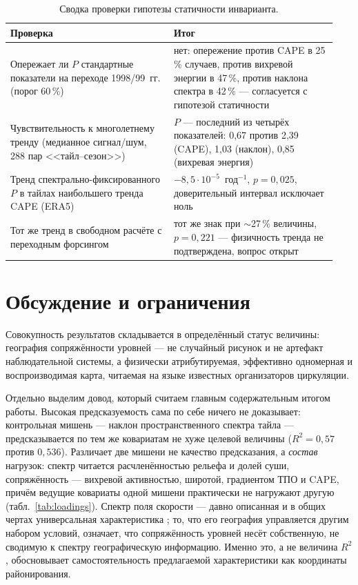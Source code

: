 \documentclass[11pt,a4paper]{article}
\begin{document}
\begin{table}[t]
\centering
\caption{Сводка проверки гипотезы статичности инварианта.}
\label{tab:static}
\small
\begin{tabular}{@{}p{0.47\linewidth}p{0.47\linewidth}@{}}
\toprule
Проверка & Итог\\
\midrule
Опережает ли $P$ стандартные показатели на переходе 1998/99~гг. (порог 60\,\%) & нет: опережение против CAPE в 25\,\% случаев, против вихревой энергии в 47\,\%, против наклона спектра в 42\,\% --- согласуется с гипотезой статичности\\
Чувствительность к многолетнему тренду (медианное сигнал/шум, 288 пар <<тайл--сезон>>) & $P$ --- последний из четырёх показателей: 0,67 против 2,39 (CAPE), 1,03 (наклон), 0,85 (вихревая энергия)\\
Тренд спектрально-фиксированного $P$ в тайлах наибольшего тренда CAPE (ERA5) & $-8{,}5\cdot10^{-5}$~год$^{-1}$, $p=0{,}025$, доверительный интервал исключает ноль\\
Тот же тренд в свободном расчёте с переходным форсингом & тот же знак при $\sim$27\,\% величины, $p=0{,}221$ --- физичность тренда не подтверждена, вопрос открыт\\
\bottomrule
\end{tabular}
\end{table}

\section{Обсуждение и ограничения}
\label{sec:limitations}

Совокупность результатов складывается в определённый статус величины: география сопряжённости уровней --- не случайный рисунок и не артефакт наблюдательной системы, а физически атрибутируемая, эффективно одномерная и воспроизводимая карта, читаемая на языке известных организаторов циркуляции.

Отдельно выделим довод, который считаем главным содержательным итогом работы. Высокая предсказуемость сама по себе ничего не доказывает: контрольная мишень --- наклон пространственного спектра тайла --- предсказывается по тем же ковариатам не хуже целевой величины ($R^2=0{,}57$ против $0{,}536$). Различает две мишени не качество предсказания, а \emph{состав} нагрузок: спектр читается расчленённостью рельефа и долей суши, сопряжённость --- вихревой активностью, широтой, градиентом ТПО и CAPE, причём ведущие ковариаты одной мишени практически не нагружают другую (табл.~\ref{tab:loadings}). Спектр поля скорости --- давно описанная и в общих чертах универсальная характеристика \cite{NastromGage1985,Lovejoy2011}; то, что его география управляется другим набором условий, означает, что сопряжённость уровней несёт собственную, не сводимую к спектру географическую информацию. Именно это, а не величина $R^2$, обосновывает самостоятельность предлагаемой характеристики как координаты районирования.
\end{document}
